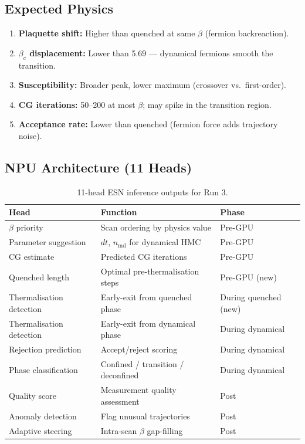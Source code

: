 \documentclass[11pt,a4paper]{article}
\newcommand{\btc}{\beta_c}
\begin{document}
\subsection{Expected Physics}

\begin{enumerate}
  \item \textbf{Plaquette shift:} Higher than quenched at same $\beta$
        (fermion backreaction).
  \item \textbf{$\btc$ displacement:} Lower than 5.69 --- dynamical fermions
        smooth the transition.
  \item \textbf{Susceptibility:} Broader peak, lower maximum (crossover
        vs.\ first-order).
  \item \textbf{CG iterations:} 50--200 at most $\beta$; may spike in the
        transition region.
  \item \textbf{Acceptance rate:} Lower than quenched (fermion force adds
        trajectory noise).
\end{enumerate}

\subsection{NPU Architecture (11 Heads)}

\begin{table}[H]
\centering
\caption{11-head ESN inference outputs for Run 3.}
\label{tab:11head}
\renewcommand{\arraystretch}{1.25}
\begin{tabular}{lll}
\toprule
Head & Function & Phase \\
\midrule
$\beta$ priority           & Scan ordering by physics value         & Pre-GPU \\
Parameter suggestion       & $dt$, $n_\text{md}$ for dynamical HMC  & Pre-GPU \\
CG estimate                & Predicted CG iterations                & Pre-GPU \\
Quenched length            & Optimal pre-thermalisation steps       & Pre-GPU (new) \\
Thermalisation detection   & Early-exit from quenched phase         & During quenched (new) \\
Thermalisation detection   & Early-exit from dynamical phase        & During dynamical \\
Rejection prediction       & Accept/reject scoring                  & During dynamical \\
Phase classification       & Confined / transition / deconfined     & During dynamical \\
Quality score              & Measurement quality assessment         & Post \\
Anomaly detection          & Flag unusual trajectories              & Post \\
Adaptive steering          & Intra-scan $\beta$ gap-filling         & Post \\
\bottomrule
\end{tabular}
\end{table}
\end{document}
